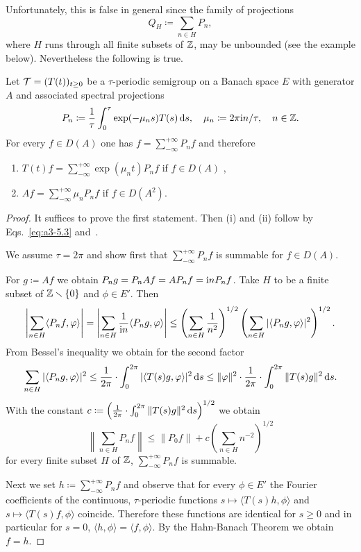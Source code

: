Unfortunately, this is false in general since the family of projections
\[
Q_{H} \coloneq \sum_{n \in H} P_{n} ,
\]
where $H$ runs through all finite subsets of\/ $\mathbb{Z}$, may be unbounded (see the example below).
Nevertheless the following is true.
\begin{theorem}\label{thm:a3-5.4}
Let $\TT = (T(t))_{t \geq 0}$ be a $\tau$-periodic semigroup on a Banach space $E$ with generator $A$ and associated spectral projections
\[
P_{n} \coloneq  \frac{1}{\tau}\int_{0}^{\tau} \exp(-\mu_{n}s)T(s) \mathop{}\!\mathrm{d}{s}, \quad \mu_{n} \coloneq 2\pi\mathrm{i} n/\tau, \quad n \in \mathbb{Z}  .
\]
For every $f \in D(A)$ one has $f = \sum_{-\infty}^{+\infty} P_{n}f$ and therefore
\begin{enumerate}[\upshape (i)]
\item 
$T(t)f = \sum_{-\infty}^{+\infty} \exp(\mu_{n}t)P_{n}f$ \quad if\/ $f \in D(A)$ ,

\item 
$Af = \sum_{-\infty}^{+\infty} \mu_{n}P_{n}f$ \quad if\/ $f \in D(A^{2})$. 
\end{enumerate}
\end{theorem}
\begin{proof}
It suffices to prove the first statement. Then (i) and (ii) follow by Eqs.~\eqref{eq:a3-5.3} and~.

We assume $\tau = 2\pi$ and show first that $\sum_{-\infty}^{+\infty} P_{n}f$ is summable for $f \in D(A)$.

For $g \coloneq Af$ we obtain $P_{n}g = P_{n}Af = AP_{n}f = \mathrm{i} nP_{n}f$.
Take $H$ to be a finite subset of\/ $\mathbb{Z} \smallsetminus \{0\}$ and $\phi \in E'$. Then
\[
\left|\sum_{n \in H} \langle P_{n}f,\phi \rangle\right|
= \left|\sum_{n \in H} \frac{1}{\im n} \langle P_{n}g,\phi \rangle\right| 
\leq \left(\sum_{n \in H} \frac{1}{n^2}\right)^{1/2}\left(\sum_{n \in H} |\langle P_{n}g,\phi \rangle|^{2}\right)^{1/2} .
\]
From Bessel's inequality we obtain for the second factor
\[
\sum_{n \in H} |\langle P_{n}g,\phi \rangle|^{2} \leq \frac{1}{2\pi} \cdot \int_{0}^{2\pi} |\langle T(s)g,\phi \rangle|^{2}  \ds 
\leq \|\phi\|^{2} \cdot \frac{1}{2\pi} \cdot \int_{0}^{2\pi} \|T(s)g\|^{2}  \ds  .
\]
With the constant $c \coloneq \left(\frac{1}{2\pi} \cdot \int_{0}^{2\pi} \|T(s)g\|^{2} \mathop{}\!\mathrm{d}{s}\right)^{1/2}$ we obtain
\[
\left\|\sum_{n \in H} P_{n}f\right\| \leq \|P_{0} f\|+c\left(\sum_{n \in H} n^{-2}\right)^{1/2}
\]
for every finite subset $H$ of\/ $\mathbb{Z}$, \ie $\sum_{-\infty}^{+\infty} P_{n}f$ is summable.

Next we set $h \coloneq \sum_{-\infty}^{+\infty} P_{n}f$ and observe that for every $\phi \in E'$ the Fourier coefficients of the continuous, $\tau$-periodic functions
$s \mapsto \langle T(s)h,\phi \rangle$ and $s \mapsto \langle T(s)f,\phi \rangle$
coincide.
Therefore these functions are identical for $s \geq 0$ and in particular for $s = 0$, \ie 
$\langle h, \phi \rangle = \langle f, \phi \rangle$.
By the Hahn-Banach Theorem we obtain $f = h$.
\end{proof}
